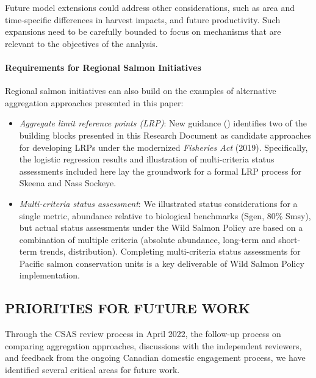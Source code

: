 \documentclass[french,11pt]{book}
\begin{document}
Future model extensions could address other considerations, such as area and time-specific differences in harvest impacts, and future productivity. Such expansions need to be carefully bounded to focus on mechanisms that are relevant to the objectives of the analysis.

\paragraph{Requirements for Regional Salmon Initiatives}\label{requirements-for-regional-salmon-initiatives}

Regional salmon initiatives can also build on the examples of alternative aggregation approaches presented in this paper:
\begin{itemize}

\item
  \emph{Aggregate limit reference points (LRP)}: New guidance () identifies two of the building blocks presented in this Research Document as candidate approaches for developing LRPs under the modernized \emph{Fisheries Act} (2019). Specifically, the logistic regression results and illustration of multi-criteria status assessments included here lay the groundwork for a formal LRP process for Skeena and Nass Sockeye.
\item
  \emph{Multi-criteria status assessment}: We illustrated status considerations for a single metric, abundance relative to biological benchmarks (Sgen, 80\% Smsy), but actual status assessments under the Wild Salmon Policy are based on a combination of multiple criteria (absolute abundance, long-term and short-term trends, distribution). Completing multi-criteria status assessments for Pacific salmon conservation units is a key deliverable of Wild Salmon Policy implementation.
\end{itemize}
\subsection{PRIORITIES FOR FUTURE WORK}\label{PrioritiesFuture}

Through the CSAS review process in April 2022, the follow-up process on comparing aggregation approaches, discussions with the independent reviewers, and feedback from the ongoing Canadian domestic engagement process, we have identified several critical areas for future work.
\end{document}
